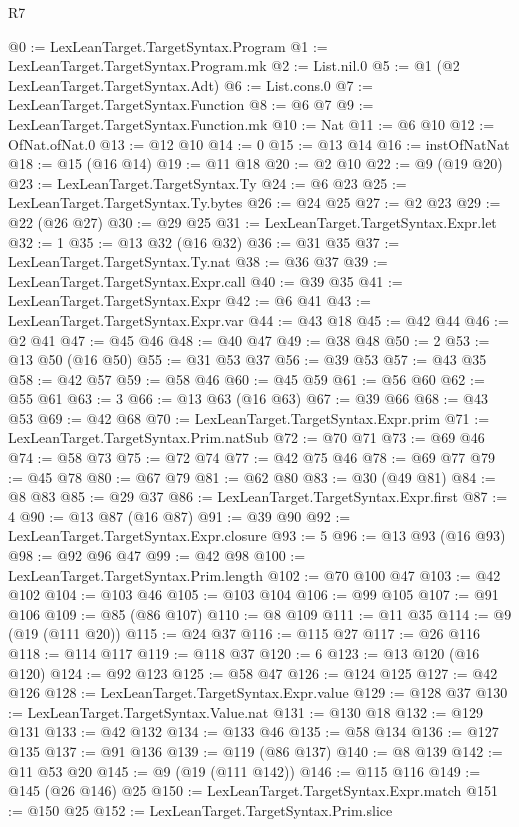 \begin{lexlean}{R7}
\begin{coremodule}
@0 := LexLeanTarget.TargetSyntax.Program
@1 := LexLeanTarget.TargetSyntax.Program.mk
@2 := List.nil.{0}
@5 := @1 (@2 LexLeanTarget.TargetSyntax.Adt)
@6 := List.cons.{0}
@7 := LexLeanTarget.TargetSyntax.Function
@8 := @6 @7
@9 := LexLeanTarget.TargetSyntax.Function.mk
@10 := Nat
@11 := @6 @10
@12 := OfNat.ofNat.{0}
@13 := @12 @10
@14 := 0
@15 := @13 @14
@16 := instOfNatNat
@18 := @15 (@16 @14)
@19 := @11 @18
@20 := @2 @10
@22 := @9 (@19 @20)
@23 := LexLeanTarget.TargetSyntax.Ty
@24 := @6 @23
@25 := LexLeanTarget.TargetSyntax.Ty.bytes
@26 := @24 @25
@27 := @2 @23
@29 := @22 (@26 @27)
@30 := @29 @25
@31 := LexLeanTarget.TargetSyntax.Expr.let
@32 := 1
@35 := @13 @32 (@16 @32)
@36 := @31 @35
@37 := LexLeanTarget.TargetSyntax.Ty.nat
@38 := @36 @37
@39 := LexLeanTarget.TargetSyntax.Expr.call
@40 := @39 @35
@41 := LexLeanTarget.TargetSyntax.Expr
@42 := @6 @41
@43 := LexLeanTarget.TargetSyntax.Expr.var
@44 := @43 @18
@45 := @42 @44
@46 := @2 @41
@47 := @45 @46
@48 := @40 @47
@49 := @38 @48
@50 := 2
@53 := @13 @50 (@16 @50)
@55 := @31 @53 @37
@56 := @39 @53
@57 := @43 @35
@58 := @42 @57
@59 := @58 @46
@60 := @45 @59
@61 := @56 @60
@62 := @55 @61
@63 := 3
@66 := @13 @63 (@16 @63)
@67 := @39 @66
@68 := @43 @53
@69 := @42 @68
@70 := LexLeanTarget.TargetSyntax.Expr.prim
@71 := LexLeanTarget.TargetSyntax.Prim.natSub
@72 := @70 @71
@73 := @69 @46
@74 := @58 @73
@75 := @72 @74
@77 := @42 @75 @46
@78 := @69 @77
@79 := @45 @78
@80 := @67 @79
@81 := @62 @80
@83 := @30 (@49 @81)
@84 := @8 @83
@85 := @29 @37
@86 := LexLeanTarget.TargetSyntax.Expr.first
@87 := 4
@90 := @13 @87 (@16 @87)
@91 := @39 @90
@92 := LexLeanTarget.TargetSyntax.Expr.closure
@93 := 5
@96 := @13 @93 (@16 @93)
@98 := @92 @96 @47
@99 := @42 @98
@100 := LexLeanTarget.TargetSyntax.Prim.length
@102 := @70 @100 @47
@103 := @42 @102
@104 := @103 @46
@105 := @103 @104
@106 := @99 @105
@107 := @91 @106
@109 := @85 (@86 @107)
@110 := @8 @109
@111 := @11 @35
@114 := @9 (@19 (@111 @20))
@115 := @24 @37
@116 := @115 @27
@117 := @26 @116
@118 := @114 @117
@119 := @118 @37
@120 := 6
@123 := @13 @120 (@16 @120)
@124 := @92 @123
@125 := @58 @47
@126 := @124 @125
@127 := @42 @126
@128 := LexLeanTarget.TargetSyntax.Expr.value
@129 := @128 @37
@130 := LexLeanTarget.TargetSyntax.Value.nat
@131 := @130 @18
@132 := @129 @131
@133 := @42 @132
@134 := @133 @46
@135 := @58 @134
@136 := @127 @135
@137 := @91 @136
@139 := @119 (@86 @137)
@140 := @8 @139
@142 := @11 @53 @20
@145 := @9 (@19 (@111 @142))
@146 := @115 @116
@149 := @145 (@26 @146) @25
@150 := LexLeanTarget.TargetSyntax.Expr.match
@151 := @150 @25
@152 := LexLeanTarget.TargetSyntax.Prim.slice

\end{coremodule}
\end{lexlean}
